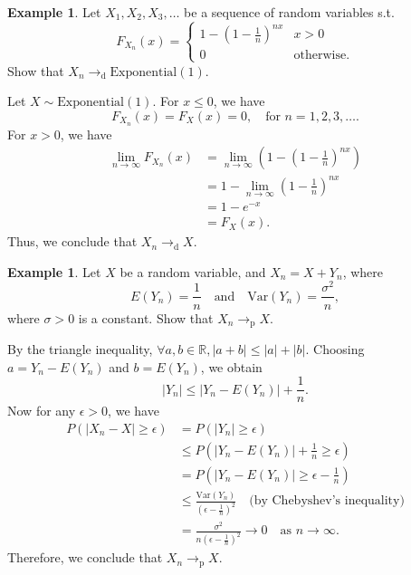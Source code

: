 \documentclass[12pt]{report}
\theoremstyle{definition}
\begin{document}
\newtheorem{convergence in distribution eg}[theorem]{Example}
\begin{convergence in distribution eg}
    Let $X_1,X_2,X_3,\ldots$ be a sequence of random variables s.t.
    \[
        F_{X_n}(x)=
        \begin{cases}
            1-{(1-\frac{1}{n})}^{nx} & x>0 \\
            0 & \text{otherwise}.
        \end{cases} 
    \]
    Show that $X_n\rightarrow_\text{d}\text{Exponential}(1)$.
    
    \medskip
    Let $X\sim\text{Exponential}(1)$. For $x\le 0$, we have
    \[
        F_{X_n}(x)=F_X(x)=0,\quad\text{for }n=1,2,3,\ldots.
    \]
    For $x>0$, we have
    \begin{align*}
        \lim_{n\rightarrow\infty}F_{X_n}(x)
        & =
        \lim_{n\rightarrow\infty}\left(1-{\left(1-\frac{1}{n}\right)}^{nx}\right) \\
        & = 1-\lim_{n\rightarrow\infty}{\left(1-\frac{1}{n}\right)}^{nx} \\
        & = 1-e^{-x} \\
        & = F_X(x).
    \end{align*} 
    Thus, we conclude that $X_n\rightarrow_\text{d}X$.
\end{convergence in distribution eg}

\newtheorem{convergence in probability eg}[theorem]{Example}
\begin{convergence in probability eg}
    Let $X$ be a random variable, and $X_n=X+Y_n$, where
    \[
        E(Y_n)=\frac{1}{n}\quad\text{and}\quad
        \text{Var}(Y_n)=\frac{\sigma^{2}}{n},
    \]
    where $\sigma>0$ is a constant. Show that $X_n\rightarrow_\text{p}X$.

    \medskip
    By the triangle inequality, $\forall a,b\in\mathbb{R}, |a+b|\le|a|+|b|$.
    Choosing $a=Y_n-E(Y_n)$ and $b=E(Y_n)$, we obtain
    \[
        |Y_n|\le |Y_n-E(Y_n)|+\frac{1}{n}.
    \]
    Now for any $\epsilon>0$, we have
    \begin{align*}
        P(|X_n-X|\ge\epsilon)
        & = P(|Y_n|\ge\epsilon) \\
        & \le P(|Y_n-E(Y_n)|+\frac{1}{n}\ge\epsilon) \\
        & = P(|Y_n-E(Y_n)|\ge\epsilon-\frac{1}{n}) \\
        & \le \frac{\text{Var}(Y_n)}{{\left(\epsilon-\frac{1}{n}\right)}^{2}}
        \quad\text{(by Chebyshev's inequality)} \\
        & = \frac{\sigma^{2}}{n{\left(\epsilon-\frac{1}{n}\right)}^{2}}
        \rightarrow 0\quad\text{as }n\rightarrow\infty.
    \end{align*} 
    Therefore, we conclude that $X_n\rightarrow_\text{p}X$.
\end{convergence in probability eg}
\end{document}
